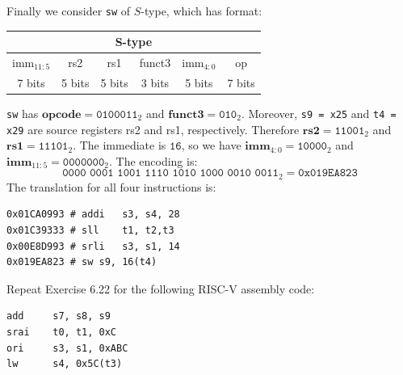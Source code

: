 \documentclass[12pt]{article}
\newenvironment{ex}[2][Exercise]{\begin{trivlist}
		\item[\hskip \labelsep {\bfseries #1}\hskip \labelsep {\bfseries #2.}]}{\end{trivlist}}
\newenvironment{sol}[1][Solution]{\begin{trivlist}
		\item[\hskip \labelsep {\bfseries #1:}]}{\end{trivlist}}
\begin{document}
\begin{sol}
\[	\]
	Finally we consider \texttt{sw} of $S$-type, which has format:
	\begin{center}
		\begin{tabular}{|c|c|c|c|c|c|}
			\multicolumn{6}{c}{S-type}\\
			\hline
			$\text{imm}_{11:5}$ & rs2 & rs1 & funct3 & $\text{imm}_{4:0}$ & op\\
			\hline
			7 bits & 5 bits & 5 bits & 3 bits & 5 bits & 7 bits\\
			\hline
		\end{tabular}
	\end{center}
	\texttt{sw} has $\textbf{opcode}=\texttt{0100011}_2$ and $\textbf{funct3}=\texttt{010}_2$.
	Moreover, \texttt{s9 = x25} and \texttt{t4 = x29} are source registers rs2 and rs1,
	respectively. Therefore $\textbf{rs2}=\texttt{11001}_2$	and $\textbf{rs1}=\texttt{11101}_2$.
	The immediate is $\texttt{16}$, so we have $\textbf{imm}_{4:0} = \texttt{10000}_2$ and
	$\textbf{imm}_{11:5}=\texttt{0000000}_2$.
	The encoding is:
	\[
	\texttt{0000 0001 1001 1110 1010 1000 0010 0011}_2=\texttt{0x019EA823}
	\]
	The translation for all four instructions is:
	\begin{lstlisting}[language={}]
0x01CA0993 # addi	s3,	s4,	28
0x01C39333 # sll	t1,	t2,t3
0x00E8D993 # srli	s3,	s1,	14
0x019EA823 # sw	s9,	16(t4)
	\end{lstlisting}
\end{sol}

\begin{ex}{6.23}
	Repeat Exercise 6.22 for the following RISC-V assembly code:
	\begin{lstlisting}[language={}]
add		s7,	s8,	s9
srai	t0,	t1,	0xC
ori		s3,	s1,	0xABC
lw		s4,	0x5C(t3)
	\end{lstlisting}
\end{ex}
\end{document}
